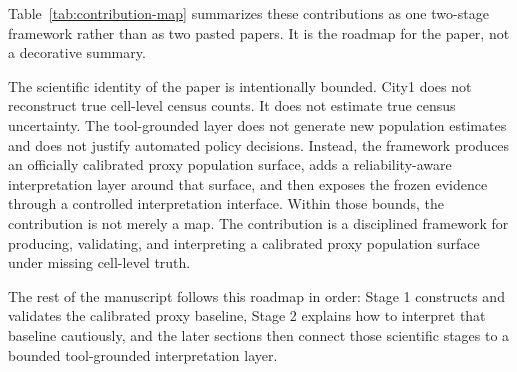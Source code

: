 Table~\ref{tab:contribution-map} summarizes these contributions as one two-stage framework rather than as two pasted papers. It is the roadmap for the paper, not a decorative summary.



The scientific identity of the paper is intentionally bounded. City1 does not reconstruct true cell-level census counts. It does not estimate true census uncertainty. The tool-grounded layer does not generate new population estimates and does not justify automated policy decisions. Instead, the framework produces an officially calibrated proxy population surface, adds a reliability-aware interpretation layer around that surface, and then exposes the frozen evidence through a controlled interpretation interface. Within those bounds, the contribution is not merely a map. The contribution is a disciplined framework for producing, validating, and interpreting a calibrated proxy population surface under missing cell-level truth.

The rest of the manuscript follows this roadmap in order: Stage 1 constructs and validates the calibrated proxy baseline, Stage 2 explains how to interpret that baseline cautiously, and the later sections then connect those scientific stages to a bounded tool-grounded interpretation layer.
